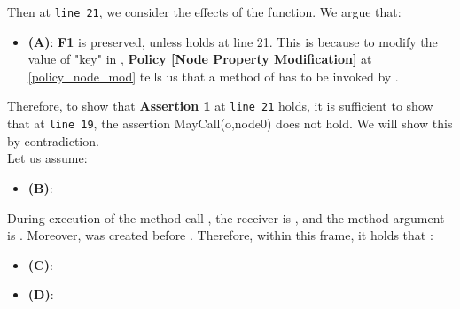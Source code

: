 \documentclass[a4paper,11pt,twoside]{article}
\begin{document}
Then at \texttt{line 21}, we consider the effects of the  function. We argue that:
\begin{itemize}
\item \textbf{(A)}: \textbf{F1} is preserved, unless \textbf{} holds at line 21. This is because to modify the value of "key" in , \textbf{Policy [Node Property Modification]} at \cref{policy_node_mod} tells us that a method of  has to be invoked by .
\end{itemize}
Therefore, to show that \textbf{Assertion 1} at \texttt{line 21} holds, it is sufficient to show that at \texttt{line 19}, the assertion MayCall(o,node0) does not hold. We will show this by contradiction.\\

Let us assume:
\begin{itemize}\item \textbf{(B)}: \end{itemize}

During execution of the method call , the receiver is , and the method argument is . Moreover,  was created before . Therefore, within this frame, it holds that : 
\begin{itemize}
\item \textbf{(C)}: 
\item \textbf{(D)}: 
\end{itemize}
\end{document}
